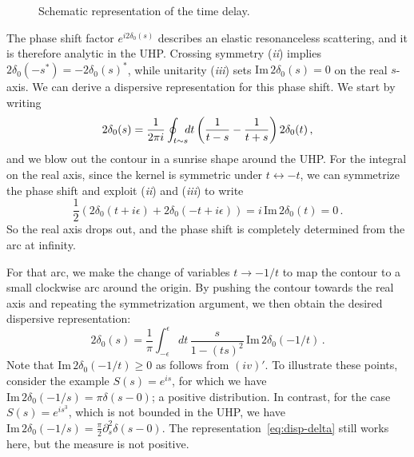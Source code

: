 \documentclass[
 reprint,
 amsmath,
 pre,
 amssymb,
 nofootinbib,
 aps,
 longbibliography,
]{revtex4-1}
\newcommand{\<}{{\langle}}
\renewcommand{\>}{{\rangle}}
\begin{document}
\begin{figure}[t]
\centering
{}
\caption{Schematic representation of the time delay.
}
\label{fig:t-delay}
\end{figure}

The phase shift factor $e^{i2\delta_0(s)}$ describes an elastic resonanceless scattering, and it is therefore analytic in the UHP. Crossing symmetry (\textit{ii}) implies $2\delta_0(-s^*) = -2\delta_0(s)^*$, while unitarity (\textit{iii}) sets $\text{Im}\, 2\delta_0(s) = 0$ on the real $s$-axis. We can derive a dispersive representation for this phase shift. We start by writing
\begin{equation}
    2\delta_0(s) = \frac{1}{2\pi i}\oint_{t\sim s\hspace{-5pt}} dt\left(\frac{1}{t-s} - \frac{1}{t+s}\right)2\delta_0(t)\,,
\end{equation}
and we blow out the contour in a sunrise shape around the UHP. For the integral on the real axis, since the kernel is symmetric under $t\leftrightarrow -t$, we can symmetrize the phase shift and exploit (\textit{ii}) and (\textit{iii}) to write
\begin{equation}
    \frac{1}{2}(2\delta_0(t+i\epsilon)+2\delta_0(-t+i\epsilon)) = i\, \text{Im}\, 2\delta_0(t)=0\,.
\end{equation}
So the real axis drops out, and the phase shift is completely determined from the arc at infinity.

For that arc, we make the change of variables $t \to -1/t$ to map the contour to a small clockwise arc around the origin.
By pushing the contour towards the real axis and repeating the symmetrization argument, we then obtain the desired dispersive representation:
\begin{equation}\label{eq:disp-delta}
    2\delta_0(s) = \frac{1}{\pi}\int_{-\epsilon}^{\epsilon} dt\, \frac{s}{1-(ts)^2}\,\text{Im}\, 2\delta_0(-1/t)\,.
\end{equation}
Note that $\text{Im}\, 2\delta_0(-1/t)\geq0$ as follows from $(iv)'$. To illustrate these points, consider the example $S(s)=e^{is}$, for which we have $\text{Im}\, 2\delta_0(-1/s) = \pi \delta(s-0)$; a positive distribution. In contrast, for the case $S(s)=e^{is^3}$, which is not bounded in the UHP, we have $\text{Im}\, 2\delta_0(-1/s) = \frac{\pi}{2} \partial_s^2\delta(s-0)$. The representation~\eqref{eq:disp-delta} still works here, but the measure is not positive.
\end{document}
